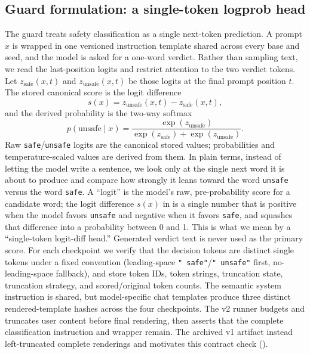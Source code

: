 \documentclass[11pt]{article}
\begin{document}
\subsection{Guard formulation: a single-token logprob head}
\label{subsec:guard}

The guard treats safety classification as a single next-token prediction. A prompt $x$ is wrapped in one versioned instruction template shared across every base and seed, and the model is asked for a one-word verdict. Rather than sampling text, we read the last-position logits and restrict attention to the two verdict tokens. Let $z_{\text{safe}}(x,t)$ and $z_{\text{unsafe}}(x,t)$ be those logits at the final prompt position $t$. The stored canonical score is the logit difference
\begin{equation}
\label{eq:score}
s(x) = z_{\text{unsafe}}(x,t) - z_{\text{safe}}(x,t),
\end{equation}
and the derived probability is the two-way softmax
\begin{equation}
\label{eq:prob}
p(\text{unsafe}\mid x) = \frac{\exp(z_{\text{unsafe}})}{\exp(z_{\text{safe}}) + \exp(z_{\text{unsafe}})}.
\end{equation}
Raw \texttt{safe}/\texttt{unsafe} logits are the canonical stored values; probabilities and temperature-scaled values are derived from them. In plain terms, instead of letting the model write a sentence, we look only at the single next word it is about to produce and compare how strongly it leans toward the word \texttt{unsafe} versus the word \texttt{safe}. A ``logit'' is the model's raw, pre-probability score for a candidate word; the logit difference $s(x)$ in  is a single number that is positive when the model favors \texttt{unsafe} and negative when it favors \texttt{safe}, and  squashes that difference into a probability between 0 and 1. This is what we mean by a ``single-token logit-diff head.'' Generated verdict text is never used as the primary score. For each checkpoint we verify that the decision tokens are distinct single tokens under a fixed convention (leading-space \texttt{" safe"}/\texttt{" unsafe"} first, no-leading-space fallback), and store token IDs, token strings, truncation state, truncation strategy, and scored/original token counts. The semantic system instruction is shared, but model-specific chat templates produce three distinct rendered-template hashes across the four checkpoints. The v2 runner budgets and truncates user content before final rendering, then asserts that the complete classification instruction and wrapper remain. The archived v1 artifact instead left-truncated complete renderings and motivates this contract check ().
\end{document}
